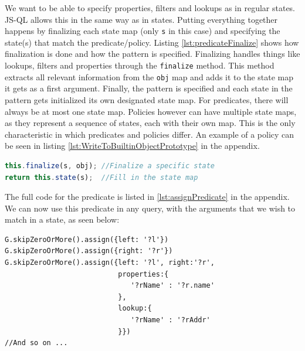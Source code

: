 We want to be able to specify properties, filters and lookups as in regular states. JS-QL allows this in the same way as in states. Putting everything together happens by finalizing each state map (only \texttt{s} in this case) and specifying the state(s) that match the predicate/policy. Listing \ref{lst:predicateFinalize} shows how finalization is done and how the pattern is specified. Finalizing handles things like lookups, filters and properties through the \texttt{finalize} method. This method extracts all relevant information from the \texttt{obj} map and adds it to the state map it gets as a first argument. Finally, the pattern is specified and each state in the pattern gets initialized its own designated state map. For predicates, there will always be at most one state map. Policies however can have multiple state maps, as they represent a sequence of states, each with their own map. This is the only characteristic in which predicates and policies differ. An example of a policy can be seen in listing \ref{lst:WriteToBuiltinObjectPrototype} in the appendix.

\begin{lstlisting}[label={lst:predicateFinalize},language=JavaScript, caption=Finalizing the \texttt{assign} predicate,mathescape=true]
this.finalize(s, obj); //Finalize a specific state
return this.state(s);  //Fill in the state map
\end{lstlisting}

The full code for the predicate is listed in \ref{lst:assignPredicate} in the appendix. We can now use this predicate in any query, with the arguments that we wish to match in a state, as seen below:

\begin{lstlisting}[label={lst:assignCall},language=JSQL, caption=Using the \texttt{assign} predicate,mathescape=true]
G.skipZeroOrMore().assign({left: '?l'})
G.skipZeroOrMore().assign({right: '?r'})
G.skipZeroOrMore().assign({left: '?l', right:'?r',
                           properties:{
                              '?rName' : '?r.name'
                           },
                           lookup:{
                              '?rName' : '?rAddr'
                           }}) 
//And so on ...
\end{lstlisting}

